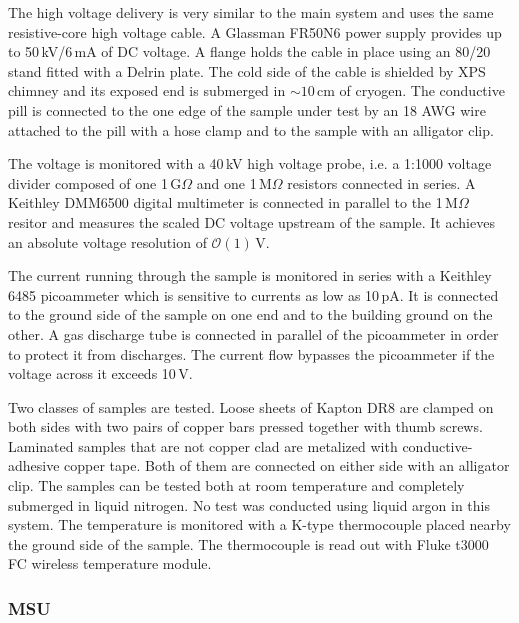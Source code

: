 \documentclass[a4paper,12pt]{article}
\begin{document}
The high voltage delivery is very similar to the main system and uses the same resistive-core high voltage cable. A Glassman FR50N6 power supply provides up to 50\,kV/6\,mA of DC voltage.  A flange holds the cable in place using an 80/20 stand fitted with a Delrin plate. The cold side of the cable is shielded by XPS chimney and its exposed end is submerged in $\sim10$\,cm of cryogen. The conductive pill is connected to the one edge of the sample under test by an 18 AWG wire attached to the pill with a hose clamp and to the sample with an alligator clip.

The voltage is monitored with a 40\,kV high voltage probe, i.e. a 1:1000 voltage divider composed of one 1\,G$\Omega$ and one 1\,M$\Omega$ resistors connected in series. A Keithley DMM6500 digital multimeter is connected in parallel to the 1\,M$\Omega$ resitor and measures the scaled DC voltage upstream of the sample. It achieves an absolute voltage resolution of $\mathcal{O}(1)\,$V.

The current running through the sample is monitored in series with a Keithley 6485 picoammeter which is sensitive to currents as low as 10\,pA. It is connected to the ground side of the sample on one end and to the building ground on the other. A gas discharge tube is connected in parallel of the picoammeter in order to protect it from discharges. The current flow bypasses the picoammeter if the voltage across it exceeds 10\,V.

Two classes of samples are tested. Loose sheets of Kapton DR8 are clamped on both sides with two pairs of copper bars pressed together with thumb screws. Laminated samples that are not copper clad are metalized with conductive-adhesive copper tape. Both of them are connected on either side with an alligator clip. The samples can be tested both at room temperature and completely submerged in liquid nitrogen. No test was conducted using liquid argon in this system. The temperature is monitored with a K-type thermocouple placed nearby the ground side of the sample. The thermocouple is read out with Fluke t3000 FC wireless temperature module.

\subsubsection{MSU}
\label{sec:MSU}
\end{document}
